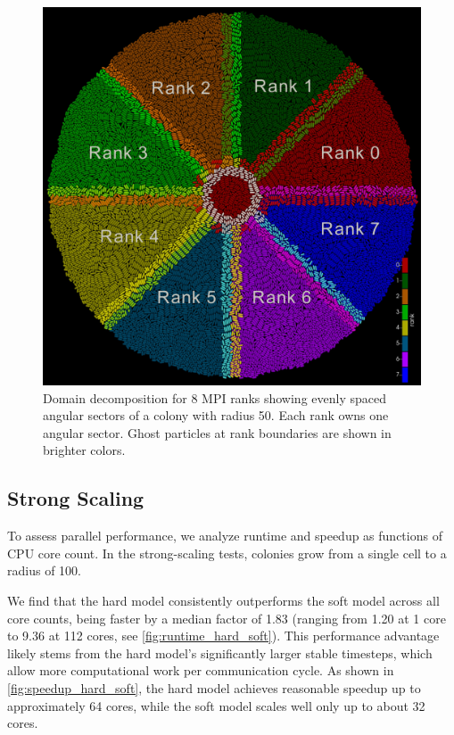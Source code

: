 \documentclass[conference]{IEEEtran}
\begin{document}
\begin{figure}[H]
    \centering
    \includegraphics[width=\linewidth]{figures/runtimes/domain_decomposition.jpeg}
    \caption{Domain decomposition for 8 MPI ranks showing evenly spaced angular sectors of a colony with radius 50. Each rank owns one angular sector. Ghost particles at rank boundaries are shown in brighter colors.}
    \label{fig:domain_decomposition}
\end{figure}

\subsection{Strong Scaling}
\label{sec:strong_scaling}

To assess parallel performance, we analyze runtime and speedup as functions of CPU core count. In the strong-scaling tests, colonies grow from a single cell to a radius of 100.

We find that the hard model consistently outperforms the soft model across all core counts, being faster by a median factor of 1.83 (ranging from 1.20 at 1 core to 9.36 at 112 cores, see \autoref{fig:runtime_hard_soft}). This performance advantage likely stems from the hard model's significantly larger stable timesteps, which allow more computational work per communication cycle. As shown in \autoref{fig:speedup_hard_soft}, the hard model achieves reasonable speedup up to approximately 64 cores, while the soft model scales well only up to about 32 cores.
\end{document}

